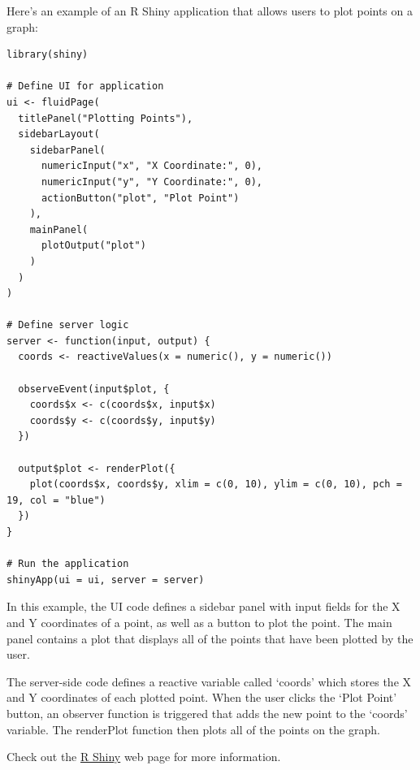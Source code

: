 \documentclass[
]{book}
\begin{document}
Here's an example of an R Shiny application that allows users to plot points on a graph:

\begin{verbatim}
library(shiny)

# Define UI for application
ui <- fluidPage(
  titlePanel("Plotting Points"),
  sidebarLayout(
    sidebarPanel(
      numericInput("x", "X Coordinate:", 0),
      numericInput("y", "Y Coordinate:", 0),
      actionButton("plot", "Plot Point")
    ),
    mainPanel(
      plotOutput("plot")
    )
  )
)

# Define server logic
server <- function(input, output) {
  coords <- reactiveValues(x = numeric(), y = numeric())

  observeEvent(input$plot, {
    coords$x <- c(coords$x, input$x)
    coords$y <- c(coords$y, input$y)
  })

  output$plot <- renderPlot({
    plot(coords$x, coords$y, xlim = c(0, 10), ylim = c(0, 10), pch = 19, col = "blue")
  })
}

# Run the application
shinyApp(ui = ui, server = server)
\end{verbatim}

In this example, the UI code defines a sidebar panel with input fields for the X and Y coordinates of a point, as well as a button to plot the point. The main panel contains a plot that displays all of the points that have been plotted by the user.

The server-side code defines a reactive variable called `coords' which stores the X and Y coordinates of each plotted point. When the user clicks the `Plot Point' button, an observer function is triggered that adds the new point to the `coords' variable. The renderPlot function then plots all of the points on the graph.

Check out the \href{https://shiny.rstudio.com/}{R Shiny} web page for more information.
\end{document}
